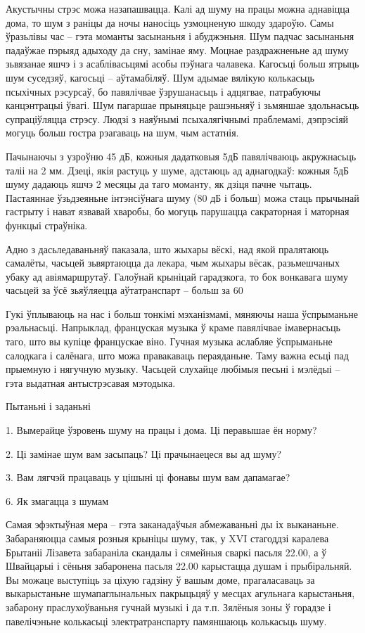 Акустычны стрэс можа назапашвацца. Калі ад шуму на працы можна аднавіцца дома, то шум з раніцы да ночы наносіць узмоцненую шкоду здароўю. Самы ўразьлівы час – гэта моманты засынаньня і абуджэньня. Шум падчас засынаньня падаўжае пэрыяд адыходу да сну, замінае яму. Моцнае раздражненьне ад шуму зьвязанае яшчэ і з асаблівасьцямі асобы пэўнага чалавека. Кагосьці больш ятрыць шум суседзяў, кагосьці – аўтамабіляў. Шум адымае вялікую колькасьць псыхічных рэсурсаў, бо павялічвае ўзрушанасьць і адцягвае, патрабуючы канцэнтрацыі ўвагі. Шум пагаршае прыняцьце рашэньняў і зьмяншае здольнасьць супраціўляцца стрэсу. Людзі з наяўнымі псыхалягічнымі праблемамі, дэпрэсіяй могуць больш гостра рэагаваць на шум, чым астатнія.

Пачынаючы з узроўню 45 дБ, кожныя дадатковыя 5дБ павялічваюць акружнасьць таліі на 2 мм. Дзеці, якія растуць у шуме, адстаюць ад аднагодкаў: кожныя 5дБ шуму дадаюць яшчэ 2 месяцы да таго моманту, як дзіця пачне чытаць. Пастаяннае ўзьдзеяньне інтэнсіўнага шуму (80 дБ і больш) можа стаць прычынай гастрыту і нават язвавай хваробы, бо могуць парушацца сакраторная і маторная функцыі страўніка.

Адно з дасьледаваньняў паказала, што жыхары вёскі, над якой пралятаюць самалёты, часьцей зьвяртаюцца да лекара, чым жыхары вёсак, разьмешчаных убаку ад авіямаршрутаў. Галоўнай крыніцай гарадзкога, то бок вонкавага шуму часьцей за ўсё зьяўляецца аўтатранспарт – больш за 60%

Гукі ўплываюць на нас і больш тонкімі мэханізмамі, мяняючы наша ўспрыманьне рэальнасьці. Напрыклад, француская музыка ў краме павялічвае імавернасьць таго, што вы купіце францускае віно. Гучная музыка аслабляе ўспрыманьне салодкага і салёнага, што можа правакаваць пераяданьне. Таму важна есьці пад прыемную і нягучную музыку. Часьцей слухайце любімыя песьні і мэлёдыі – гэта выдатная антыстрэсавая мэтодыка.

Пытаньні і заданьні

1. Вымерайце ўзровень шуму на працы і дома. Ці перавышае ён норму?

2. Ці замінае шум вам засыпаць? Ці прачынаецеся вы ад шуму?

3. Вам лягчэй працаваць у цішыні ці фонавы шум вам дапамагае?


6. Як змагацца з шумам

Самая эфэктыўная мера – гэта заканадаўчыя абмежаваньні ды іх выкананьне. Забараняюцца самыя розныя крыніцы шуму, так, у XVI стагоддзі каралева Брытаніі Лізавета забараніла скандалы і сямейныя сваркі пасьля 22.00, а ў Швайцарыі і сёньня забаронена пасьля 22.00 карыстацца душам і прыбіральняй. Вы можаце выступіць за ціхую гадзіну ў вашым доме, прагаласаваць за выкарыстаньне шумапаглынальных пакрыцьцяў у месцах агульнага карыстаньня, забарону праслухоўваньня гучнай музыкі і да т.п. Зялёныя зоны ў горадзе і павелічэньне колькасьці электратранспарту памяншаюць колькасьць шуму.

